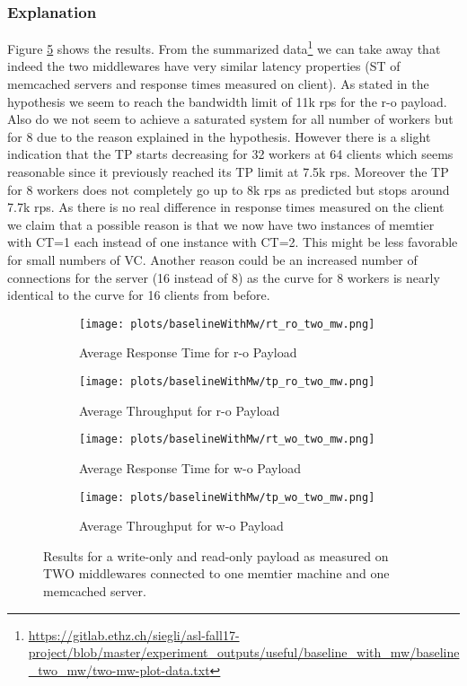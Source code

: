 \documentclass[11pt,a4paper]{article}
\begin{document}
\subsubsection{Explanation}
Figure \ref{plt:bl:two_mw} shows the results. From the summarized data\footnote{\url{https://gitlab.ethz.ch/siegli/asl-fall17-project/blob/master/experiment_outputs/useful/baseline_with_mw/baseline_two_mw/two-mw-plot-data.txt}} we can take away that indeed the two middlewares have very similar latency properties (ST of memcached servers and response times measured on client). As stated in the hypothesis we seem to reach the bandwidth limit of 11k rps for the r-o payload. Also do we not seem to achieve a saturated system for all number of workers but for 8 due to the reason explained in the hypothesis. However there is a slight indication that the TP starts decreasing for 32 workers at 64 clients which seems reasonable since it previously reached its TP limit at 7.5k rps. Moreover the TP for 8 workers does not completely go up to 8k rps as predicted but stops around 7.7k rps. As there is no real difference in response times measured on the client we claim that a possible reason is that we now have two instances of memtier with CT=1 each instead of one instance with CT=2. This might be less favorable for small numbers of VC. Another reason could be an increased number of connections for the server (16 instead of 8) as the curve for 8 workers is nearly identical to the curve for 16 clients from before. 


\begin{figure}[H]
\centering
\begin{subfigure}{.5\textwidth}
    \centering
    \texttt{[image: plots/baselineWithMw/rt\_ro\_two\_mw.png]}
    \caption{Average Response Time for r-o Payload }
    \label{plt:bl:rt_ro_two_mw}
\end{subfigure}%
\begin{subfigure}{.5\textwidth}
    \centering
    \texttt{[image: plots/baselineWithMw/tp\_ro\_two\_mw.png]}
    \caption{Average Throughput for r-o Payload}
    \label{plt:bl:tp_ro_two_mw}

\end{subfigure}
\begin{subfigure}{.5\textwidth}
    \centering
    \texttt{[image: plots/baselineWithMw/rt\_wo\_two\_mw.png]}
    \caption{Average Response Time for w-o Payload }
    \label{plt:bl:rt_wo_two_mw}
\end{subfigure}%
\begin{subfigure}{.5\textwidth}
    \centering
    \texttt{[image: plots/baselineWithMw/tp\_wo\_two\_mw.png]}
    \caption{Average Throughput for w-o Payload}
    \label{plt:bl:tp_wo_two_mw}

\end{subfigure}
\caption{Results for a write-only and read-only payload as measured on TWO middlewares connected to one memtier machine and one memcached server.}
\label{plt:bl:two_mw}
\end{figure}
\end{document}
